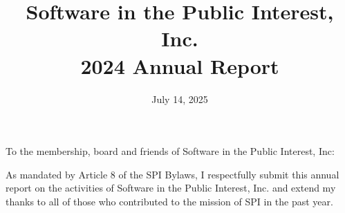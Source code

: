 \documentclass[a4paper]{report}
\begin{document}
\title{Software in the Public Interest, Inc.\\
2024 Annual Report}
\date{July 14, 2025}

\maketitle

\newpage


\hspace{1em}

To the membership, board and friends of Software in the Public Interest, Inc:

As mandated by Article 8 of the SPI Bylaws, I respectfully submit this annual report on the activities of Software in the Public Interest, Inc. and extend my thanks to all of those who contributed to the mission of SPI in the past year.
\end{document}
